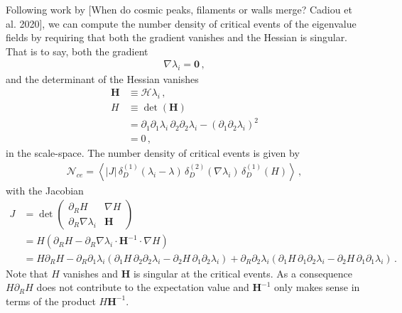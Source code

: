 \documentclass[a4paper, 11pt]{article}
\begin{document}
Following work by [When do cosmic peaks, filaments or walls merge? Cadiou et al. 2020], we can compute the number density of critical events of the eigenvalue fields by requiring that both the gradient vanishes and the Hessian is singular. That is to say, both the gradient
\begin{align}
\nabla \lambda_i = \bm{0}\,,
\end{align}
and the determinant of the Hessian vanishes
\begin{align}
\bm{H} &\equiv\mathcal{H}\lambda_i\,,\\
H &\equiv \det (\bm{H})\nonumber\\
&= \partial_1 \partial_1 \lambda_i\, \partial_2\partial_2 \lambda_i - (\partial_1 \partial_2 \lambda_i)^2\nonumber\\
&=0\,,
\end{align}
in the scale-space. The number density of critical events is given by
\begin{align}
\mathcal{N}_{ce} = 
\left\langle \left|J\right| \,
\delta_D^{(1)}(\lambda_i-\lambda)\,
\delta_D^{(2)}(\nabla \lambda_i)\,
\delta_D^{(1)}(H)
\right\rangle\,,
\end{align}
with the Jacobian 
\begin{align}
J &= \det 
\begin{pmatrix} 
\partial_R H 					& \nabla H \\
\partial_R \nabla \lambda_i  	& \bm{H}
\end{pmatrix}\nonumber\\
&= H(\partial_R H -\partial_R \nabla \lambda_i \cdot \bm{H}^{-1} \cdot \nabla H)\\
&= H \partial_R H
-\partial_R \partial_1 \lambda_i( 
\partial_1 H \, \partial_2 \partial_2 \lambda_i - \partial_2 H \, \partial_1 \partial_2\lambda_i    ) 
+ 
\partial_R \partial_2 \lambda_i (
 \partial_1 H \, \partial_1 \partial_2 \lambda_i 
 -
\partial_2  H \, \partial_1 \partial_1 \lambda_i )\,.\nonumber
\end{align}
Note that $H$ vanishes and $\bm{H}$ is singular at the critical events. As a consequence $H\partial_R H$ does not contribute to the expectation value and $\bm{H}^{-1}$ only makes sense in terms of the product $H \bm{H}^{-1}$. 
\end{document}
